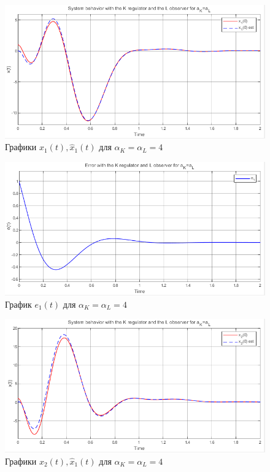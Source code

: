 \documentclass[a4paper, 12pt]{article}
\begin{document}
    
    \newpage
    \vspace*{20mm}
    \begin{figure}[H]
        \centering
        \includegraphics[scale=0.8]{2task_aK=aL_x1.png}
        \captionsetup{skip=0pt}
        \caption{Графики $x_1(t),\hat{x}_1(t)$ для $\alpha_K=\alpha_L=4$}
        \label{2task_aKeqaL_x1}
    \end{figure}
    \begin{figure}[H]
        \centering
        \includegraphics[scale=0.8]{2task_aK=aL_e1.png}
        \captionsetup{skip=0pt}
        \caption{График $e_1(t)$ для $\alpha_K=\alpha_L=4$}
        \label{2task_aKeqaL_e1}
    \end{figure}
    \newpage
    \vspace*{20mm}
    \begin{figure}[H]
        \centering
        \includegraphics[scale=0.8]{2task_aK=aL_x2.png}
        \captionsetup{skip=0pt}
        \caption{Графики $x_2(t),\hat{x}_1(t)$ для $\alpha_K=\alpha_L=4$}
        \label{2task_aKeqaL_x2}
    \end{figure}
\end{document}
